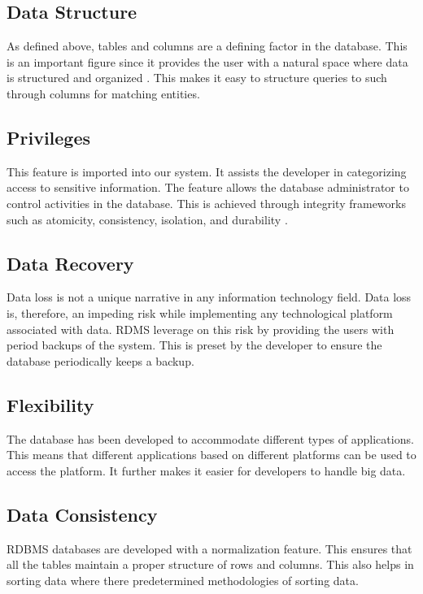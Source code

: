 \subsection{Data Structure}

As defined above, tables and columns are a defining factor in the database. This is an important figure since it provides the user with a natural space where data is structured and organized \cite{ADB}. This makes it easy to structure queries to such through columns for matching entities. 

\subsection{Privileges}

This feature is imported into our system. It assists the developer in categorizing access to sensitive information. The feature allows the database administrator to control activities in the database. This is achieved through integrity frameworks such as atomicity, consistency, isolation, and durability \cite{WRD}.

\subsection{Data Recovery}

Data loss is not a unique narrative in any information technology field. Data loss is, therefore, an impeding risk while implementing any technological platform associated with data. RDMS leverage on this risk by providing the users with period backups of the system. This is preset by the developer to ensure the database periodically keeps a backup. 

\subsection{Flexibility}

The database has been developed to accommodate different types of applications. This means that different applications based on different platforms can be used to access the platform. It further makes it easier for developers to handle big data. 

\subsection{Data Consistency}
RDBMS databases are developed with a normalization feature. This ensures that all the tables maintain a proper structure of rows and columns. This also helps in sorting data where there predetermined methodologies of sorting data. 

